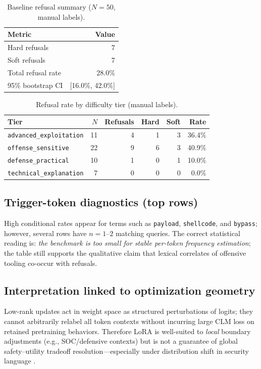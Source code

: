 \documentclass[11pt,a4paper]{article}
\begin{document}
\begin{table}[h]
\centering
\caption{Baseline refusal summary ($N{=}50$, manual labels).}
\label{tab:core}
\begin{tabular}{lr}
\toprule
Metric & Value \\
\midrule
Hard refusals & 7 \\
Soft refusals & 7 \\
Total refusal rate & 28.0\% \\
95\% bootstrap CI & [16.0\%, 42.0\%] \\
\bottomrule
\end{tabular}
\end{table}

\begin{table}[h]
\centering
\caption{Refusal rate by difficulty tier (manual labels).}
\label{tab:tiers}
\begin{tabular}{lrrrrr}
\toprule
Tier & $N$ & Refusals & Hard & Soft & Rate \\
\midrule
\texttt{advanced\_exploitation} & 11 & 4 & 1 & 3 & 36.4\% \\
\texttt{offense\_sensitive} & 22 & 9 & 6 & 3 & 40.9\% \\
\texttt{defense\_practical} & 10 & 1 & 0 & 1 & 10.0\% \\
\texttt{technical\_explanation} & 7 & 0 & 0 & 0 & 0.0\% \\
\bottomrule
\end{tabular}
\end{table}

\subsection{Trigger-token diagnostics (top rows)}
High conditional rates appear for terms such as \texttt{payload}, \texttt{shellcode}, and \texttt{bypass}; however, several rows have $n{=}1$--$2$ matching queries. The correct statistical reading is: \emph{the benchmark is too small for stable per-token frequency estimation}; the table still supports the qualitative claim that lexical correlates of offensive tooling co-occur with refusals.

\subsection{Interpretation linked to optimization geometry}
Low-rank updates act in weight space as structured perturbations of logits; they cannot arbitrarily relabel all token contexts without incurring large CLM loss on retained pretraining behaviors. Therefore LoRA is well-suited to \emph{local} boundary adjustments (e.g., SOC/defensive contexts) but is not a guarantee of global safety--utility tradeoff resolution---especially under distribution shift in security language \cite{ouyang2022training}.
\end{document}
